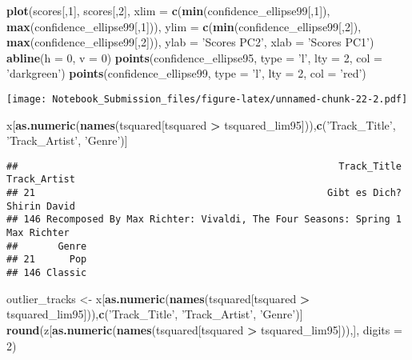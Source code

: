 \documentclass[
]{article}
\newenvironment{Shaded}{\begin{snugshade}}{\end{snugshade}}
\newcommand{\DataTypeTok}[1]{\textcolor[rgb]{0.13,0.29,0.53}{#1}}
\newcommand{\DecValTok}[1]{\textcolor[rgb]{0.00,0.00,0.81}{#1}}
\newcommand{\KeywordTok}[1]{\textcolor[rgb]{0.13,0.29,0.53}{\textbf{#1}}}
\newcommand{\NormalTok}[1]{#1}
\newcommand{\OperatorTok}[1]{\textcolor[rgb]{0.81,0.36,0.00}{\textbf{#1}}}
\newcommand{\StringTok}[1]{\textcolor[rgb]{0.31,0.60,0.02}{#1}}
\begin{document}
\begin{Shaded}
\begin{Highlighting}[]
\KeywordTok{plot}\NormalTok{(scores[,}\DecValTok{1}\NormalTok{], scores[,}\DecValTok{2}\NormalTok{], }\DataTypeTok{xlim =} \KeywordTok{c}\NormalTok{(}\KeywordTok{min}\NormalTok{(confidence_ellipse99[,}\DecValTok{1}\NormalTok{]), }\KeywordTok{max}\NormalTok{(confidence_ellipse99[,}\DecValTok{1}\NormalTok{])), }
     \DataTypeTok{ylim =} \KeywordTok{c}\NormalTok{(}\KeywordTok{min}\NormalTok{(confidence_ellipse99[,}\DecValTok{2}\NormalTok{]), }\KeywordTok{max}\NormalTok{(confidence_ellipse99[,}\DecValTok{2}\NormalTok{])), }\DataTypeTok{ylab =} \StringTok{'Scores PC2'}\NormalTok{, }\DataTypeTok{xlab =} \StringTok{'Scores PC1'}\NormalTok{)}
\KeywordTok{abline}\NormalTok{(}\DataTypeTok{h =} \DecValTok{0}\NormalTok{, }\DataTypeTok{v =} \DecValTok{0}\NormalTok{)}
\KeywordTok{points}\NormalTok{(confidence_ellipse95, }\DataTypeTok{type =} \StringTok{'l'}\NormalTok{, }\DataTypeTok{lty =} \DecValTok{2}\NormalTok{, }\DataTypeTok{col =} \StringTok{'darkgreen'}\NormalTok{)}
\KeywordTok{points}\NormalTok{(confidence_ellipse99, }\DataTypeTok{type =} \StringTok{'l'}\NormalTok{, }\DataTypeTok{lty =} \DecValTok{2}\NormalTok{, }\DataTypeTok{col =} \StringTok{'red'}\NormalTok{)}
\end{Highlighting}
\end{Shaded}

\texttt{[image: Notebook\_Submission\_files/figure-latex/unnamed-chunk-22-2.pdf]}

\begin{Shaded}
\begin{Highlighting}[]
\NormalTok{x[}\KeywordTok{as.numeric}\NormalTok{(}\KeywordTok{names}\NormalTok{(tsquared[tsquared }\OperatorTok{>}\StringTok{ }\NormalTok{tsquared_lim95])),}\KeywordTok{c}\NormalTok{(}\StringTok{'Track_Title'}\NormalTok{, }\StringTok{'Track_Artist'}\NormalTok{, }\StringTok{'Genre'}\NormalTok{)]}
\end{Highlighting}
\end{Shaded}

\begin{verbatim}
##                                                        Track_Title Track_Artist
## 21                                                   Gibt es Dich? Shirin David
## 146 Recomposed By Max Richter: Vivaldi, The Four Seasons: Spring 1  Max Richter
##       Genre
## 21      Pop
## 146 Classic
\end{verbatim}

\begin{Shaded}
\begin{Highlighting}[]
\NormalTok{outlier_tracks <-}\StringTok{ }\NormalTok{x[}\KeywordTok{as.numeric}\NormalTok{(}\KeywordTok{names}\NormalTok{(tsquared[tsquared }\OperatorTok{>}\StringTok{ }\NormalTok{tsquared_lim95])),}\KeywordTok{c}\NormalTok{(}\StringTok{'Track_Title'}\NormalTok{, }\StringTok{'Track_Artist'}\NormalTok{, }\StringTok{'Genre'}\NormalTok{)]}
\KeywordTok{round}\NormalTok{(z[}\KeywordTok{as.numeric}\NormalTok{(}\KeywordTok{names}\NormalTok{(tsquared[tsquared }\OperatorTok{>}\StringTok{ }\NormalTok{tsquared_lim95])),], }\DataTypeTok{digits =} \DecValTok{2}\NormalTok{)}
\end{Highlighting}
\end{Shaded}
\end{document}
